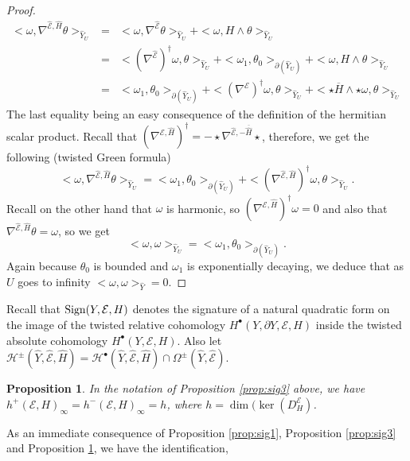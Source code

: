\documentclass[12pt]{amsart}
\theoremstyle{plain}
\newtheorem{proposition}[theorem]{Proposition}
\theoremstyle{definition}
\theoremstyle{remark}
\begin{document}
\begin{proof}
\begin{eqnarray*}
<\omega, \nabla^{\hat{\mathcal E}, {\hat H}}\theta >_{{\hat Y}_U} & = & <\omega, \nabla^{\hat{\mathcal E}}\theta>_{{\hat Y}_U} + <\omega, H\wedge \theta>_{{\hat Y}_U}\\
& = & <(\nabla^{\hat{\mathcal E}})^\dag\omega, \theta>_{{\hat Y}_U} + <\omega_1, \theta_0>_{\partial ({\hat Y}_U)} + <\omega, H\wedge \theta>_{{\hat Y}_U}\\
&=&  <\omega_1, \theta_0>_{\partial ({\hat Y}_U)} + <(\nabla^{\mathcal E})^\dag\omega, \theta>_{{\hat Y}_U} + <\star {\overline H} \wedge \star \omega, \theta>_{{\hat Y}_U}
\end{eqnarray*}
The last equality being {{an easy consequence of}} the definition of the hermitian scalar product. Recall that $(\nabla^{{\mathcal E}, {\hat H}})^\dag = -\star \nabla^{\hat{\mathcal E}, -{\overline{{\hat H}}}}  \star$, therefore,  we get the following (twisted Green formula) 
$$
<\omega, \nabla^{\hat{\mathcal E}, {\hat H}} \theta >_{{\hat Y}_U} =  <\omega_1, \theta_0>_{\partial ({\hat Y}_U)}  + <(\nabla^{\hat{\mathcal E}, {\hat H}})^\dag\omega, \theta>_{{\hat Y}_U} .
$$
Recall on the other hand that $\omega$ is harmonic, so $(\nabla^{{\mathcal E}, {\hat H}})^\dag\omega =0$ and also that $\nabla^{\hat{\mathcal E}, {\hat H}} \theta = \omega$, so we get
$$
<\omega, \omega >_{{\hat Y}_U} =  <\omega_1, \theta_0>_{\partial ({\hat Y}_U)} .
$$
Again because $ \theta_0$ is bounded and $\omega_1$ is exponentially decaying, we deduce that as $U$ goes to infinity $
<\omega, \omega >_{{\hat Y}} = 0.$

\end{proof}

Recall that ${\rm Sign}(Y, {\mathcal E}, H)$ denotes the signature of a natural 
quadratic form on the image 
of the twisted relative cohomology $H^\bullet(Y, \partial Y, {\mathcal E}, H)$ inside the twisted absolute 
cohomology $H^\bullet(Y,  {\mathcal E}, H)$. 
Also let ${\mathcal H}^\pm(\hat Y, \hat {\mathcal E}, \hat H) = {\mathcal H}^\bullet (\hat Y,  \hat {\mathcal E}, \hat H) \cap \Omega^\pm(\hat Y, \hat {\mathcal E})$.

\begin{proposition}\label{prop:sig6} In the notation of Proposition \ref{prop:sig3} above,
we have $h^+({\mathcal E}, H)_\infty = h^-({\mathcal E}, H)_\infty = h$, where $h = \dim(\ker(D^{\mathcal E}_H)$.
\end{proposition}

As an immediate consequence of Proposition \ref{prop:sig1}, Proposition \ref{prop:sig3} and 
Proposition \ref{prop:sig6}, we have the identification,
\end{document}
